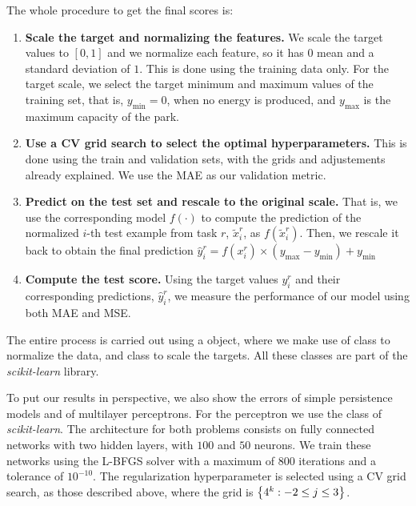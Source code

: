 %
The whole procedure to get the final scores is:
\begin{enumerate}
    \item \textbf{Scale the target and normalizing the features.} We scale the target values to $[0, 1]$ and we normalize each feature, so it has $0$ mean and a standard deviation of $1$. This is done using the training data only. 
    For the target scale, we select the target minimum and maximum values of the training set, that is, $y_\text{min} = 0$, when no energy is produced, and $y_\text{max}$ is the maximum capacity of the park.    
    \item \textbf{Use a CV grid search to select the optimal hyperparameters.} This is done using the train and validation sets, with the grids and adjustements already explained. We use the MAE as our validation metric.
    \item \textbf{Predict on the test set and rescale to the original scale.} That is, we use the corresponding model $f(\cdot)$ to compute the prediction of the normalized $i$-th test example from task $r$, $\tilde{x}_i^r$, as $f(\tilde{x}_i^r)$. Then, we rescale it back to obtain the final prediction $\hat{y}_i^r = f(x_i^r) \times (y_\text{max} - y_\text{min} ) + y_\text{min}$
    \item \textbf{Compute the test score.} Using the target values $y_i^r$ and their corresponding predictions, $\hat{y}_i^r$, we measure the performance of our model using both MAE and MSE.
\end{enumerate}
The entire process is carried out using a  object, where we make use of class  to normalize the data, and  class to scale the targets. All these classes are part of the \emph{scikit-learn} library.

%
To put our results in perspective, we also show the errors of simple persistence models and of multilayer perceptrons. For the perceptron we use the  class of \emph{scikit-learn}. The architecture for both problems consists on fully connected networks with two hidden layers, with $100$ and $50$ neurons. We train these networks using the L-BFGS solver with a maximum of $800$ iterations and a tolerance of $10^{-10}$. The regularization hyperparameter is selected using a CV grid search, as those described above, where the grid is $\left\{4^k: -2 \leq j \leq 3\right\}$.






